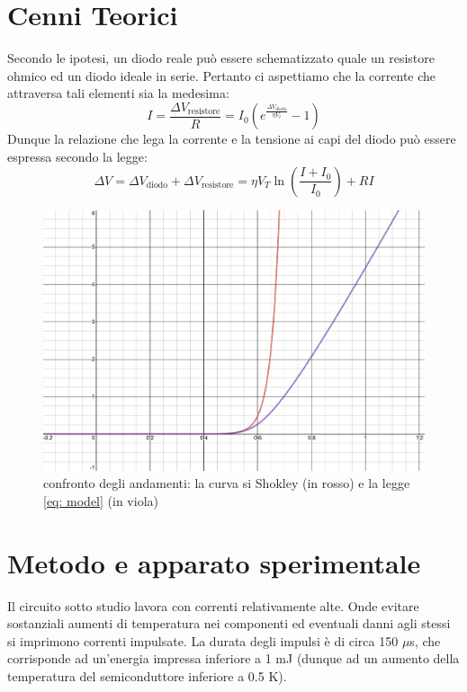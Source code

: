 \documentclass{article}[a4paper, oneside, 11pt]
\begin{document}
\section{Cenni Teorici}
Secondo le ipotesi, un diodo reale può essere schematizzato quale un resistore 
ohmico ed un diodo ideale in serie. Pertanto ci aspettiamo che la corrente che 
attraversa tali elementi sia la medesima:
\begin{equation}
	I = \frac{\Delta V_{\text{resistore}}}{R} =
	I_0 \left( e^{\frac{\Delta V_{\text{diodo}}}{\eta V_t}} - 1\right)
\end{equation}
Dunque la relazione che lega la corrente e la tensione ai capi del diodo può 
essere espressa secondo la legge:
\begin{equation}\label{eq: model}
	\Delta V = \Delta V_{\text{diodo}} + \Delta V_{\text{resistore}} = \eta V_T \ln{\left(\frac{
	I+I_0}{I_0}\right)} + RI
\end{equation}
\begin{figure}[H]
	\centering 
 		\includegraphics[scale=0.25]{./confronto_curve.png}
 	\caption{confronto degli andamenti: la curva si Shokley (in rosso) e la legge \eqref{eq: model} (in viola)}
\end{figure}


\section{Metodo e apparato sperimentale}
Il circuito sotto studio lavora con correnti relativamente alte. Onde evitare 
sostanziali aumenti di temperatura nei componenti ed eventuali danni agli 
stessi si imprimono correnti impulsate.
La durata degli impulsi è di circa 150 $\mu$s, che 
corrisponde ad un'energia impressa inferiore a 1 mJ (dunque ad un aumento della 
temperatura del semiconduttore inferiore a 0.5 K).
\end{document}
